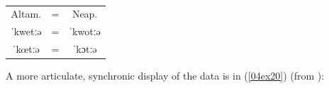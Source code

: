\documentclass[output=paper,colorlinks,citecolor=brown]{langscibook}
\begin{document}
\begin{minipage}{\textwidth}
\begin{multicols}{3}
\begin{exe}
\begin{xlist}
				\ex \label{04ex19c} \phantom{x} \vspace*{0.2cm} \\
				\hspace*{-0.2cm}\begin{tabularx}{\textwidth}{ccc}
					\rule{0pt}{2.5ex} Altam. & = & Neap. \\
					\cline{1-1}\cline{3-3}
					\multicolumn{1}{|c|}{\multirow{2}{*}{ˈkwetːə}} & \multirow{2}{*}{=} & \multicolumn{1}{|c|}{\multirow{2}{*}{ˈkwotːə}} \\
					\multicolumn{1}{|c|}{}& & \multicolumn{1}{|c|}{} \\
					\cline{1-1}\cline{3-3}
					\multicolumn{1}{|c|}{\multirow{2}{*}{ˈkœtːə}} & \multirow{2}{*}{=} & \multicolumn{1}{|c|}{\multirow{2}{*}{ˈkɔtːə}} \\
					\multicolumn{1}{|c|}{} & & \multicolumn{1}{|c|}{} \\
					\cline{1-1}\cline{3-3}
				\end{tabularx}
			\end{xlist}
		\end{exe}
	\end{multicols}
\end{minipage}

\bigskip

A more articulate, synchronic display of the  data is in (\ref{04ex20}) (from \citealt[54]{paciaroni2017}):

\bigskip
\end{document}

